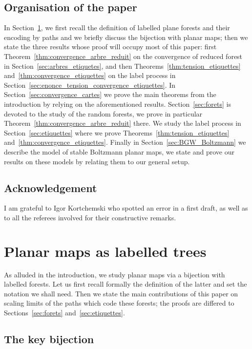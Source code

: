 \documentclass[10pt]{amsart}
\theoremstyle{definition}\newtheorem{defi}[theo]{Definition}\newtheorem{rema}[theo]{Remark}\newtheorem{exam}[theo]{Example}\newtheorem{exem}[theo]{Example}\newtheorem{nota}[theo]{Notation}
\newcommand{\1}{\ensembles{1}}
\providecommand{\?}{}
\begin{document}
\subsection{Organisation of the paper}
In Section~\ref{sec:preliminaires}, we first recall the definition of labelled plane forests and their encoding by paths and we briefly discuss the bijection with planar maps; then we state the three results whose proof will occupy most of this paper: first Theorem~\ref{thm:convergence_arbre_reduit} on the convergence of reduced forest in Section~\ref{sec:arbres_etiquetes}, and then Theorems~\ref{thm:tension_etiquettes} and~\ref{thm:convergence_etiquettes} on the label process in Section~\ref{sec:enonce_tension_convergence_etiquettes}. In Section~\ref{sec:convergence_cartes} we prove the main theorems from the introduction by relying on the aforementioned results. Section~\ref{sec:forets} is devoted to the study of the random forests, we prove in particular Theorem~\ref{thm:convergence_arbre_reduit} there. We study the label process in Section~\ref{sec:etiquettes} where we prove Theorems~\ref{thm:tension_etiquettes} and~\ref{thm:convergence_etiquettes}. Finally in Section~\ref{sec:BGW_Boltzmann} we describe the model of stable Boltzmann planar maps, we state and prove our results on these models by relating them to our general setup.



\subsection*{Acknowledgement}
I am grateful to Igor Kortchemski who spotted an error in a first draft, as well as to all the referees involved for their constructive remarks.


\section{Planar maps as labelled trees}\label{sec:preliminaires}


As alluded in the introduction, we study planar maps via a bijection with labelled forests. Let us first recall formally the definition of the latter and set the notation we shall need. Then we state the main contributions of this paper on scaling limits of the paths which code these forests; the proofs are differed to Sections~\ref{sec:forets} and~\ref{sec:etiquettes}.


\subsection{The key bijection}\label{sec:bijection}
\end{document}
